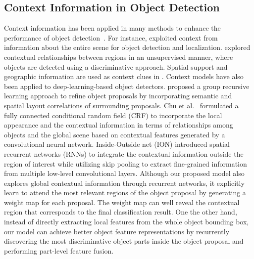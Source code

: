 \documentclass[journal]{IEEEtran}
\begin{document}
\subsection{Context Information in Object Detection}
Context information has been applied in many methods to enhance the performance of object detection~\cite{carbonetto2004statistical,li2016visual, divvala2009empirical, heitz2008learning, hoiem2005geometric, li2018contrast,torralba2010using}. For instance, \cite{torralba2010using} exploited context from information about the entire scene  for  object detection and localization. \cite{heitz2008learning} explored contextual relationships between regions in an unsupervised manner, where objects are detected using a discriminative approach. Spatial support and geographic information are used as context clues in \cite{divvala2009empirical}. Context models have also been applied to deep-learning-based object detectors. \cite{li2017multi} proposed a group recursive learning approach to refine object proposals by incorporating semantic and spatial layout correlations of surrounding proposals. Chu et al.~\cite{chu2016deep} formulated a fully connected conditional random field (CRF) to incorporate the local appearance and the contextual information in terms of relationships among objects and the global scene based on contextual features generated by a convolutional neural network. Inside-Outside net (ION) \cite{bell2016inside} introduced spatial recurrent networks (RNNs) to integrate the contextual information outside the region of interest while utilizing skip pooling to extract fine-grained information from multiple low-level convolutional layers. Although our proposed model also explores global contextual information through recurrent networks, it explicitly learn to attend the most relevant regions of the object proposal by generating a weight map for each proposal. The weight map can well reveal the contextual region that corresponds to the final classification result. One the other hand, instead of directly extracting local features from the whole object bounding box, our model can achieve better object feature representations by recurrently discovering the most discriminative object parts inside the object proposal and performing part-level feature fusion.
\end{document}
